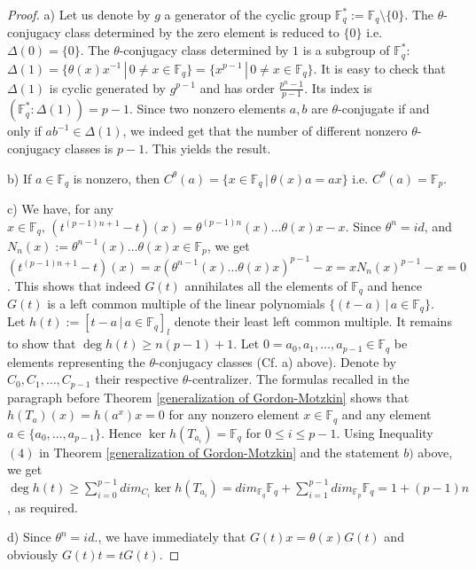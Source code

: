 \documentclass[10pt,a4paper]{amsart}
\begin{document}
\begin{proof}
	a)   Let us denote by $g$ a generator of the cyclic group $\mathbb
	F_q^{*}:=\mathbb F_q \setminus\{0\}$. The $\theta$-conjugacy class
	determined by the zero element is reduced to $\{0\}$ i.e. $\Delta (0)=\{0\}$.
	The $\theta$-conjugacy class determined by $1$ is a subgroup of $\mathbb
	F_q^*$: $\Delta (1)=\{\theta (x)x^{-1}\,|\, 0\ne x\in \mathbb F_q
	\}=\{x^{p-1}\,|\, 0\ne x\in \mathbb F_q\}$.  It is easy to check
	that $\Delta (1)$ is cyclic generated by $g^{p-1}$ and has order
	$\frac{p^n-1}{p-1}$.  Its index is $(\mathbb F_q^* : \Delta
	(1))=p-1$.   Since two nonzero elements $a,b$ are
	$\theta$-conjugate if and only if $ab^{-1}\in \Delta (1)$,  we
	indeed get that the number of different nonzero $\theta$-conjugacy classes
	is $p-1$.   This yields the result.
	
	\noindent b) If $a\in \mathbb F_q$ is nonzero, then
	$C^{\theta}(a)=\{x\in \mathbb F_q\,|\, \theta(x)a=ax\}$ i.e.
	$C^{\theta}(a)=\mathbb F_p$.
	
	\noindent c)  We have, for any $x\in \mathbb F_q,\,
	(t^{(p-1)n+1}-t)(x)=\theta^{(p-1)n}(x)\dots \theta(x)x - x$. Since
	$\theta^n=id$, and $N_n(x):=\theta^{n-1}(x)\dots
	\theta(x)x \in \mathbb
	F_p$, we get $(t^{(p-1)n+1}-t)(x)=
	x(\theta^{n-1}(x)\dots\theta(x)x )^{p-1}-x=
	xN_n(x)^{p-1}-x=0$.  This shows that indeed $G(t)$ 
	annihilates all the elements
	of $\mathbb F_q$ and hence $G(t)$ is a  left common multiple of
	the linear polynomials $\{(t-a)\,|\,a\in \mathbb F_q\}$.  Let $h(t):=[t-a\,|\,a\in \mathbb F_q]_l$ denote their least left common multiple. It remains to show that
	$\deg h(t)\ge n(p-1)+1$.  Let $0=a_0,a_1,\dots,a_{p-1}\in \mathbb{F}_q$ be
	elements  representing the $\theta$-conjugacy classes (Cf. a) above).  Denote by $C_0,C_1,\dots,C_{p-1}$ their respective
	$\theta$-centralizer.  The formulas recalled in the paragraph before  Theorem \ref{generalization of Gordon-Motzkin} shows that 
	$h(T_a)(x)=h(a^x)x=0$ for any nonzero element $x\in \mathbb F_q$ and any element 
	$a\in\{a_0,\dots,a_{p-1}\}$.   
	Hence $\ker h(T_{a_i})=\mathbb F_q$ for $0\le i \le p-1$. Using
	Inequality $(4)$ in Theorem \ref{generalization of
		Gordon-Motzkin} and the statement $b)$ above, we get $\deg h(t)\ge
	\sum_{i=0}^{p-1} dim _{C_i}\ker h(T_{a_i})=dim_{\mathbb F_q}\mathbb
	F_q + \sum_{i=1}^{p-1}dim_{\mathbb F_p}\mathbb F_q =1+(p-1)n$, as
	required.
	
	\noindent d)  Since $\theta^n=id.$, we have immediately that
	$G(t)x=\theta(x)G(t)$ and obviously $G(t)t=tG(t)$.
\end{proof}
\end{document}
